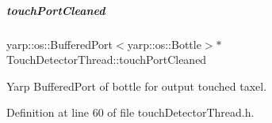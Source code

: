 \mbox{\label{group__touchDetector_aefc680e659906e2a9b7e870d8ea837be}} 
\subparagraph{\texorpdfstring{touch\+Port\+Cleaned}{touchPortCleaned}}
{\footnotesize\ttfamily yarp\+::os\+::\+Buffered\+Port$<$yarp\+::os\+::\+Bottle$>$$\ast$ Touch\+Detector\+Thread\+::touch\+Port\+Cleaned\hspace{0.3cm}{\ttfamily [protected]}}



Yarp Buffered\+Port of bottle for output touched taxel. 



Definition at line 60 of file touch\+Detector\+Thread.\+h.

